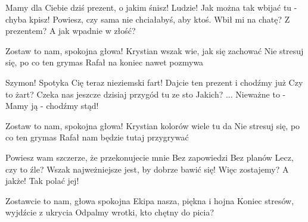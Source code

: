 \documentclass{article}
\newenvironment{mysce}
  {\begin{quote}\itshape}
  {\end{quote}}
\begin{document}
Mamy dla Ciebie dziś prezent, o jakim śnisz!
Ludzie! Jak można tak wbijać tu - chyba kpisz!
Powiesz, czy sama nie chciałabyś, aby ktoś.
Wbił mi na chatę? Z prezentem? A jak wpadnie w złość?

Zostaw to nam, spokojna głowa!
Krystian wszak wie, jak się zachować
Nie stresuj się, po co ten grymas
Rafał na koniec nawet pozmywa

Szymon! Spotyka Cię teraz nieziemski fart!
Dajcie ten prezent i chodźmy już
Czy to żart?
Czeka nas jeszcze dzisiaj przygód tu ze sto
Jakich? ... Nieważne to - Mamy ją - chodźmy stąd!

Zostaw to nam, spokojna głowa!
Krystian kolorów wiele tu da
Nie stresuj się, po co ten grymas
Rafał nam będzie tutaj przygrywać

Powiesz wam szczerze, że przekonujecie mnie
Bez zapowiedzi
Bez planów
Lecz, czy to źle?
Wszak najweżniejsze jest, by dobrze bawić się!
Więc zostajemy?
A jakże!
Tak polać jej!

Zostawcie to nam, głowa spokojna
Ekipa nasza, piękna i hojna
Koniec stresów, wyjdźcie z ukrycia
Odpalmy wrotki, kto chętny do picia?



\lipsum[4]
\begin{quote}
\lipsum[4]
\end{quote}
\lipsum[4]
\begin{mysce}
\lipsum[4]
\end{mysce}
\lipsum[4]
\end{document}
